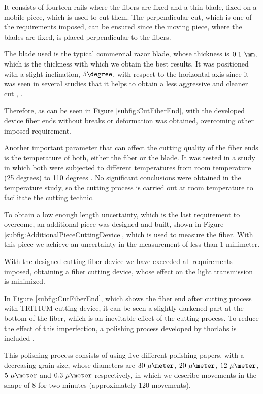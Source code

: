It consists of fourteen rails where the fibers are fixed and a thin blade, fixed on a mobile piece, which is used to cut them. The perpendicular cut, which is one of the requirements imposed, can be ensured since the moving piece, where the blades are fixed, is placed perpendicular to the fibers.

The blade used is the typical commercial razor blade, whose thickness is $0.1~\mm$, which is the thickness with which we obtain the best results. It was positioned with a slight inclination, $5\degree$, with respect to the horizontal axis since it was seen in several studies that it helps to obtain a less aggressive and cleaner cut \cite{AngleBlade}, \cite{TemperatureBlade}.

Therefore, as can be seen in Figure \ref{subfig:CutFiberEnd}, with the developed device fiber ends without breaks or deformation was obtained, overcoming other imposed requirement.

Another important parameter that can affect the cutting quality of the fiber ends is the temperature of both, either the fiber or the blade. It was tested in a study in which both were subjected to different temperatures from room temperature (25 degrees) to 110 degrees \cite{TFGAlberto}. No significant conclusions were obtained in the temperature study, so the cutting process is carried out at room temperature to facilitate the cutting technic.

To obtain a low enough length uncertainty, which is the last requirement to overcome, an additional piece was designed and built, shown in Figure \ref{subfig:AdditionalPieceCuttingDevice}, which is used to measure the fiber. With this piece we achieve an uncertainty in the measurement of less than 1 millimeter.

With the designed cutting fiber device we have exceeded all requirements imposed, obtaining a fiber cutting device, whose effect on the light transmission is minimized.

In Figure \ref{subfig:CutFiberEnd}, which shows the fiber end after cutting process with TRITIUM cutting device, it can be seen a slightly darkened part at the bottom of the fiber, which is an inevitable effect of the cutting process. To reduce the effect of this imperfection, a polishing process developed by thorlabs is included \cite{DiamondThorlabs}. 

This polishing process consists of using five different polishing papers, with a decreasing grain size, whose diameters are $30~\mu\meter$, $20~\mu\meter$, $12~\mu\meter$, $5~\mu\meter$ and $0.3~\mu\meter$ respectively, in which we describe movements in the shape of 8 for two minutes (approximately 120 movements). 

